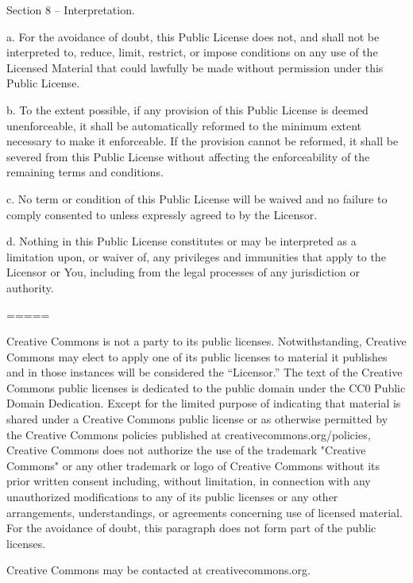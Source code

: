 Section 8 -- Interpretation.

  a. For the avoidance of doubt, this Public License does not, and
     shall not be interpreted to, reduce, limit, restrict, or impose
     conditions on any use of the Licensed Material that could lawfully
     be made without permission under this Public License.

  b. To the extent possible, if any provision of this Public License is
     deemed unenforceable, it shall be automatically reformed to the
     minimum extent necessary to make it enforceable. If the provision
     cannot be reformed, it shall be severed from this Public License
     without affecting the enforceability of the remaining terms and
     conditions.

  c. No term or condition of this Public License will be waived and no
     failure to comply consented to unless expressly agreed to by the
     Licensor.

  d. Nothing in this Public License constitutes or may be interpreted
     as a limitation upon, or waiver of, any privileges and immunities
     that apply to the Licensor or You, including from the legal
     processes of any jurisdiction or authority.


=====

Creative Commons is not a party to its public
licenses. Notwithstanding, Creative Commons may elect to apply one of
its public licenses to material it publishes and in those instances
will be considered the “Licensor.” The text of the Creative Commons
public licenses is dedicated to the public domain under the CC0 Public
Domain Dedication. Except for the limited purpose of indicating that
material is shared under a Creative Commons public license or as
otherwise permitted by the Creative Commons policies published at
creativecommons.org/policies, Creative Commons does not authorize the
use of the trademark "Creative Commons" or any other trademark or logo
of Creative Commons without its prior written consent including,
without limitation, in connection with any unauthorized modifications
to any of its public licenses or any other arrangements,
understandings, or agreements concerning use of licensed material. For
the avoidance of doubt, this paragraph does not form part of the
public licenses.

Creative Commons may be contacted at creativecommons.org.





